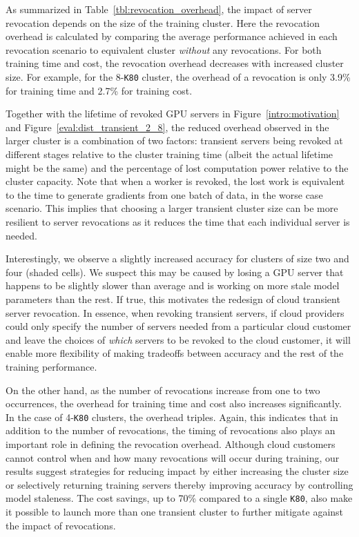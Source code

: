 As summarized in Table~\ref{tbl:revocation_overhead}, the impact of server
revocation depends on the size of the training cluster. Here the revocation
overhead is calculated by comparing the average performance achieved in each
revocation scenario to equivalent cluster \emph{without} any revocations.  For both
training time and cost, the revocation overhead decreases with increased
cluster size. For example, for the 8-\texttt{K80} cluster, the overhead of a
revocation is only 3.9\% for training time and 2.7\% for training cost. 

Together with the lifetime of revoked GPU servers in Figure~\ref{intro:motivation} and 
Figure~\ref{eval:dist_transient_2_8}, the reduced overhead observed in the
larger cluster is a combination of two factors: transient servers being revoked at different
stages relative to the cluster training time (albeit the actual lifetime might
be the same) and the percentage of lost computation power relative to the
cluster capacity. Note that when a worker is revoked, the lost work is equivalent to the 
time to generate gradients from one batch of data, in the worse case scenario.
This implies that choosing a larger transient cluster size
can be more resilient to server revocations as it reduces the time that each
individual server is needed. 

Interestingly, we  observe a slightly increased accuracy for clusters of size
two and four (shaded cells).  We suspect this may be caused by losing a GPU
server that happens to be slightly slower than average and is working on more
stale model parameters than the rest. If true, this motivates the redesign of
cloud transient server revocation. In essence, when revoking transient servers,
if cloud providers could only specify the number of servers needed from a
particular cloud customer and leave the choices of \emph{which} servers to be revoked
to the cloud customer, it will enable more flexibility of making tradeoffs
between accuracy and the rest of the training performance. 

On the other hand, as the number of revocations increase from one to two
occurrences, the overhead for training time and cost also increases
significantly. In the case of  4-\texttt{K80} clusters, the overhead triples.
Again, this indicates that in addition to the number of revocations, the timing
of revocations also plays an important role in defining the revocation
overhead. Although cloud customers cannot control when and how many revocations
will occur during training, our results suggest strategies for reducing  impact
by either increasing the cluster size or selectively returning training servers
thereby improving accuracy by controlling model staleness. The cost savings, up
to 70\% compared to a single \texttt{K80}, also make it possible to launch more
than one transient cluster to further mitigate against the impact of
revocations. 


